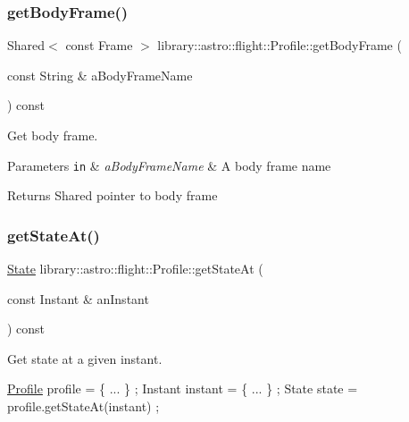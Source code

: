 \subsubsection{\texorpdfstring{get\+Body\+Frame()}{getBodyFrame()}}
{\footnotesize\ttfamily Shared$<$ const Frame $>$ library\+::astro\+::flight\+::\+Profile\+::get\+Body\+Frame (\begin{DoxyParamCaption}\item[{const String \&}]{a\+Body\+Frame\+Name }\end{DoxyParamCaption}) const}



Get body frame. 


\begin{DoxyParams}[1]{Parameters}
\mbox{\tt in}  & {\em a\+Body\+Frame\+Name} & A body frame name \\
\hline
\end{DoxyParams}
\begin{DoxyReturn}{Returns}
Shared pointer to body frame 
\end{DoxyReturn}
\mbox{\label{classlibrary_1_1astro_1_1flight_1_1_profile_a7f266d44fe664c8dce12c28067ffdd94}} 
\subsubsection{\texorpdfstring{get\+State\+At()}{getStateAt()}}
{\footnotesize\ttfamily \hyperlink{classlibrary_1_1astro_1_1flight_1_1profile_1_1_state}{State} library\+::astro\+::flight\+::\+Profile\+::get\+State\+At (\begin{DoxyParamCaption}\item[{const Instant \&}]{an\+Instant }\end{DoxyParamCaption}) const}



Get state at a given instant. 


\begin{DoxyCode}
\hyperlink{classlibrary_1_1astro_1_1flight_1_1_profile_a34d66fdddf3eda9a3fed036d6b9a4363}{Profile} profile = \{ ... \} ;
Instant instant = \{ ... \} ;
State state = profile.getStateAt(instant) ;
\end{DoxyCode}



